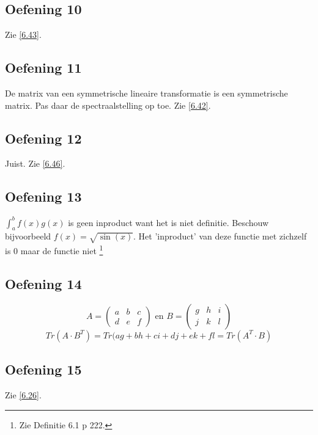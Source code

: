 \documentclass[lineaire_algebra_oplossingen.tex]{subfiles}
\begin{document}
\subsection{Oefening 10}
Zie \ref{6.43}.

\subsection{Oefening 11}
De matrix van een symmetrische lineaire transformatie is een symmetrische matrix. Pas daar de spectraalstelling op toe. Zie \ref{6.42}.

\subsection{Oefening 12}
Juist. Zie \ref{6.46}.

\subsection{Oefening 13}
$\int_a^bf(x)g(x)$ is geen inproduct want het is niet definitie. Beschouw bijvoorbeeld $f(x) = \sqrt{\sin(x)}$. Het 'inproduct' van deze functie met zichzelf is $0$ maar de functie niet \footnote{Zie Definitie 6.1 p 222.}

\subsection{Oefening 14}
\[
A = 
\begin{pmatrix}
a & b & c\\
d & e & f
\end{pmatrix}
\text{ en }
B = 
\begin{pmatrix}
g & h & i\\
j & k & l
\end{pmatrix}
\]
\[
Tr(A\cdot B^T) = 
Tr(
ag + bh + ci + dj + ek + fl
= Tr(A^T\cdot B)
\]

\subsection{Oefening 15}
Zie \ref{6.26}.
\end{document}
